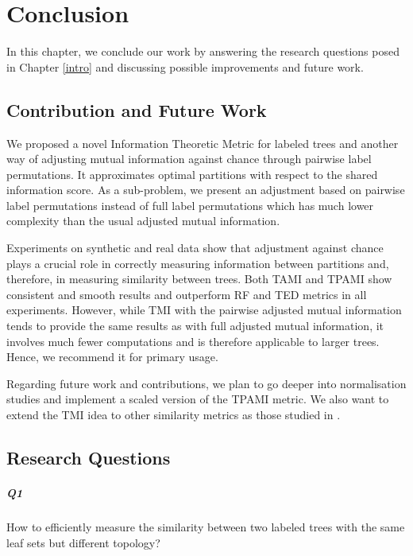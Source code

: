 \chapter{Conclusion}
\label{conclusion}

In this chapter, we conclude our work by answering the research questions posed in Chapter \ref{intro} and discussing possible improvements and future work.

\section{Contribution and Future Work}
We proposed a novel Information Theoretic Metric for labeled trees and another way of adjusting mutual information against chance through pairwise label permutations. It approximates optimal partitions with respect to the shared information score. As a sub-problem, we present an adjustment based on pairwise label permutations instead of full label permutations which has much lower complexity than the usual adjusted mutual information. 

Experiments on synthetic and real data show that adjustment against chance plays a crucial role in correctly measuring information between partitions and, therefore, in measuring similarity between trees. Both TAMI and TPAMI show consistent and smooth results and outperform RF and TED metrics in all experiments. However, while TMI with the pairwise adjusted mutual information tends to provide the same results as with full adjusted mutual information, it involves much fewer computations and is therefore applicable to larger trees. Hence, we recommend it for primary usage.

Regarding future work and contributions, we plan to go deeper into normalisation studies \cite{vinh10a} and implement a scaled version of the TPAMI metric. We also want to extend the TMI idea to other similarity metrics as those studied in \cite{romano2016adjusting}.

\section{Research Questions}

\paragraph{Q1}
\label{q1}
How to efficiently measure the similarity between two labeled trees with the same leaf sets but different topology?

